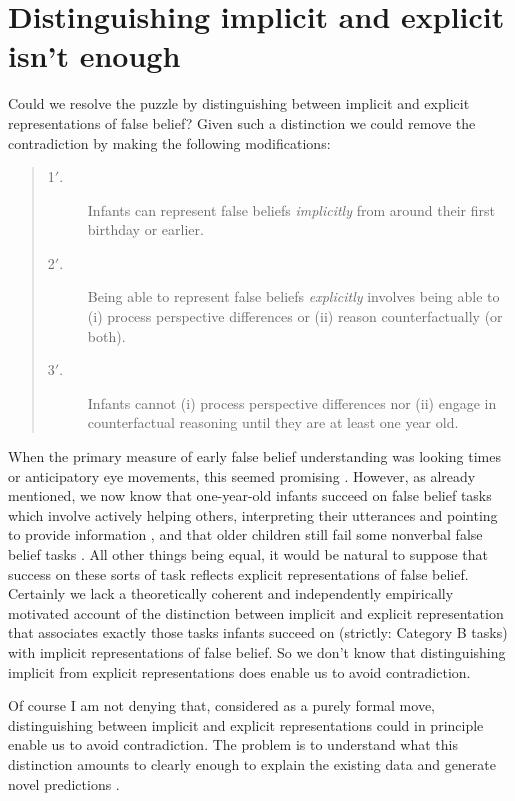 \documentclass[12pt,\papersize]{extarticle}
\begin{document}
\section{Distinguishing implicit and explicit isn't enough}
Could we resolve the puzzle by distinguishing between implicit and explicit representations of false belief?
Given such a distinction we could remove the contradiction by making the following modifications:
%
\begin{quote}
\begin{description}
\item[1$'$.] Infants can represent false beliefs \emph{implicitly} from around their first birthday or earlier. \label{infant_fb_prime}

\item[2$'$.] Being able to represent false beliefs \emph{explicitly}  involves being able to  (i) process perspective differences or (ii) reason counterfactually (or both). \label{fb_is_perspectives_prime}

\item[3$'$.] Infants cannot (i) process perspective differences nor (ii) engage in counterfactual reasoning until they are at least one year old.  \label{infant_perspectives}
\end{description}
\end{quote}
%
When the primary measure of early false belief understanding was  looking times or anticipatory eye movements, this seemed promising \citep{Clements:1994cw,Clements:2000nc,Garnham:2001ql,Ruffman:2001ng}.
However, as already mentioned, we now know that one-year-old infants succeed on false belief tasks which involve actively helping others, interpreting their utterances and pointing to provide information \citep{en_1783,Knudsen:2011fk,southgate:2010fb},
and that older children still fail some nonverbal false belief tasks \citep{Call:1999co}.
All other things being equal, it would be natural to suppose that success on these sorts of task reflects explicit representations of false belief.
Certainly we lack a theoretically coherent and independently empirically motivated account of the distinction between implicit and explicit representation that associates exactly those tasks infants succeed on (strictly: Category B tasks) with implicit representations of false belief.
So we don't know that distinguishing implicit from explicit representations does enable us to avoid contradiction.

Of course I am not denying that, considered as a purely formal move, distinguishing between implicit and explicit representations could in principle enable us to avoid contradiction.
The problem is to understand what this distinction amounts to clearly enough to explain the existing data and generate novel predictions \citep[p.\ 154]{Apperly:2010kx}.
\end{document}
